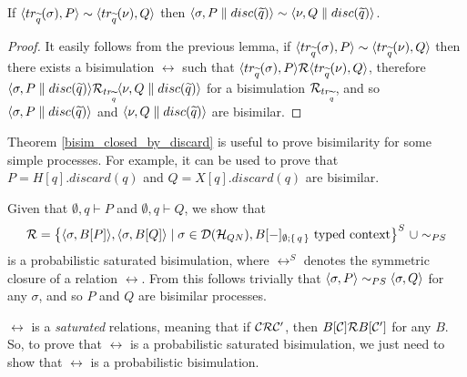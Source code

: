 \begin{theorem}\label{bisim_closed_by_discard}
If $\langle tr_{\widetilde{q}}(\sigma), P\rangle \sim \langle tr_{\widetilde{q}}(\nu), Q\rangle$ then $\langle\sigma, P \parallel disc(\widetilde{q})\rangle \sim \langle\nu, Q \parallel disc(\widetilde{q})\rangle$.
\end{theorem}
\begin{proof}
It easily follows from the previous lemma, if $\langle tr_{\widetilde{q}}(\sigma), P\rangle \sim \langle tr_{\widetilde{q}}(\nu), Q\rangle$ then there exists a bisimulation $\rel$ such that $\langle tr_{\widetilde{q}}(\sigma), P\rangle \mathcal{R} \langle tr_{\widetilde{q}}(\nu), Q\rangle$, therefore $\langle\sigma, P \parallel disc(\widetilde{q})\rangle \mathcal{R}_{tr_{\widetilde{q}}} \langle\nu, Q \parallel disc(\widetilde{q})\rangle$ for a bisimulation $\mathcal{R}_{tr_{\widetilde{q}}}$, and so $\langle\sigma, P \parallel disc(\widetilde{q})\rangle$ and $\langle\nu, Q \parallel disc(\widetilde{q})\rangle$ are bisimilar.
\end{proof}

Theorem \ref{bisim_closed_by_discard} is useful to prove bisimilarity for some simple processes. For example, it can be used to prove that $P = H[q].discard(q)$ and $Q = X[q].discard(q)$ are bisimilar.

Given that $\emptyset, {q} \vdash P$ and $\emptyset, {q} \vdash Q$, we show that
\[\mathcal{R} = \big\{\langle\sigma, B[P]\rangle, \langle\sigma, B[Q]\rangle \mid \sigma \in \mathcal{D}(\mathcal{H}_{QN}), B[{-}]_{\emptyset; \set{q}} \text{ typed context}\big\}^S\ \cup \sim_{PS}
\]
is a probabilistic saturated bisimulation, where $\rel^S$ denotes the symmetric closure of a relation $\rel$. From this follows trivially that $\langle\sigma, P\rangle \sim_{PS} \langle\sigma, Q\rangle$ for any $\sigma$, and so $P$ and $Q$ are bisimilar processes.

$\rel$ is a \textit{saturated} relations, meaning that if $\mathcal{C} \mathcal{R} \mathcal{C}'$, then $B[\mathcal{C}] \mathcal{R} B[\mathcal{C}']$ for any $B$. So, to prove that $\rel$ is a probabilistic saturated bisimulation, we just need to show that $\rel$ is a probabilistic bisimulation.

